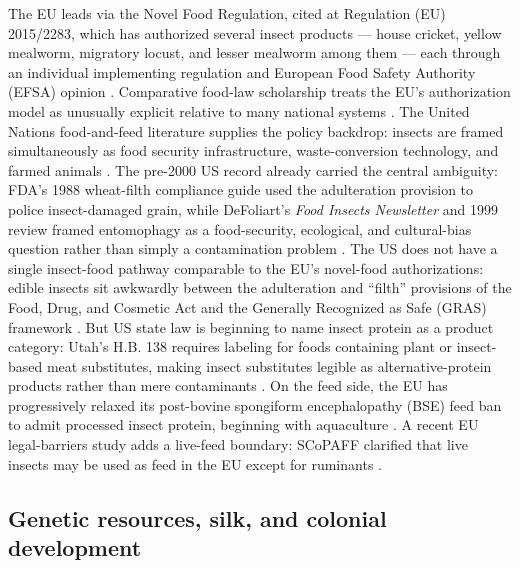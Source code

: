 \documentclass[
  english,
]{article}
\begin{document}
The EU leads via the Novel Food Regulation, cited at Regulation (EU)
2015/2283, which has authorized several insect products --- house
cricket, yellow mealworm, migratory locust, and lesser mealworm among
them --- each through an individual implementing regulation and European
Food Safety Authority (EFSA) opinion
\citep{eu2015_2283, ec_insect_novel_foods2026}. Comparative food-law
scholarship treats the EU's authorization model as unusually explicit
relative to many national systems \citep{lahteenmaki2021insectfoodfeed}.
The United Nations food-and-feed literature supplies the policy
backdrop: insects are framed simultaneously as food security
infrastructure, waste-conversion technology, and farmed animals
\citep{fao2013edible_insects}. The pre-2000 US record already carried
the central ambiguity: FDA's 1988 wheat-filth compliance guide used the
adulteration provision to police insect-damaged grain, while DeFoliart's
\emph{Food Insects Newsletter} and 1999 review framed entomophagy as a
food-security, ecological, and cultural-bias question rather than simply
a contamination problem
\citep{fda_cpg_wheat_filth1988, food_insects_newsletter1988, defoliart1999_insects_as_food}.
The US does not have a single insect-food pathway comparable to the EU's
novel-food authorizations: edible insects sit awkwardly between the
adulteration and ``filth'' provisions of the Food, Drug, and Cosmetic
Act and the Generally Recognized as Safe (GRAS) framework
\citep{ffdca342, fda_defect_levels}. But US state law is beginning to
name insect protein as a product category: Utah's H.B. 138 requires
labeling for foods containing plant or insect-based meat substitutes,
making insect substitutes legible as alternative-protein products rather
than mere contaminants \citep{utah_hb138_2025}. On the feed side, the EU
has progressively relaxed its post-bovine spongiform encephalopathy
(BSE) feed ban to admit processed insect protein, beginning with
aquaculture \citep{eu2017_893}. A recent EU legal-barriers study adds a
live-feed boundary: SCoPAFF clarified that live insects may be used as
feed in the EU except for ruminants
\citep{ziety2026_insect_farming_barriers}.

\subsection{Genetic resources, silk, and colonial
development}\label{genetic-resources-silk-and-colonial-development}
\end{document}
